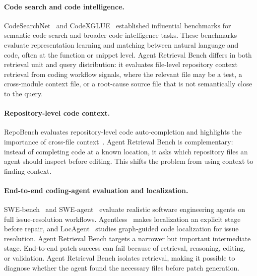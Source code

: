 \documentclass[11pt]{article}
\newcommand{\arb}{Agent Retrieval Bench}
\begin{document}
\paragraph{Code search and code intelligence.}
CodeSearchNet~\citep{husain2019codesearchnet} and CodeXGLUE~\citep{lu2021codexglue} established influential benchmarks for semantic code search and broader code-intelligence tasks. These benchmarks evaluate representation learning and matching between natural language and code, often at the function or snippet level. \arb{} differs in both retrieval unit and query distribution: it evaluates file-level repository context retrieval from coding workflow signals, where the relevant file may be a test, a cross-module context file, or a root-cause source file that is not semantically close to the query.

\paragraph{Repository-level code context.}
RepoBench evaluates repository-level code auto-completion and highlights the importance of cross-file context~\citep{liu2023repobench}. \arb{} is complementary: instead of completing code at a known location, it asks which repository files an agent should inspect before editing. This shifts the problem from using context to finding context.

\paragraph{End-to-end coding-agent evaluation and localization.}
SWE-bench~\citep{jimenez2023swebench} and SWE-agent~\citep{yang2024sweagent} evaluate realistic software engineering agents on full issue-resolution workflows. Agentless~\citep{xia2024agentless} makes localization an explicit stage before repair, and LocAgent~\citep{chen2025locagent} studies graph-guided code localization for issue resolution. \arb{} targets a narrower but important intermediate stage. End-to-end patch success can fail because of retrieval, reasoning, editing, or validation. \arb{} isolates retrieval, making it possible to diagnose whether the agent found the necessary files before patch generation.
\end{document}
